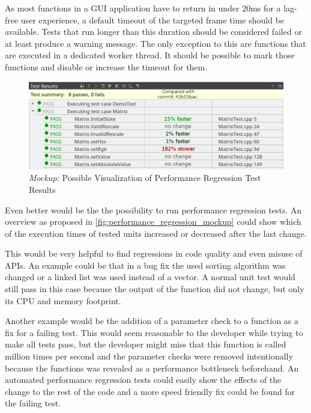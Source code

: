 \documentclass{scrreprt}
\begin{document}
As most functions in a GUI application have to return in under 20ms for a lag-free user experience, a default timeout of the targeted frame time should be available. Tests that run longer than this duration should be considered failed or at least produce a warning message. The only exception to this are functions that are executed in a dedicated worker thread. It should be possible to mark those functions and disable or increase the timeout for them.

\begin{figure}[h]
	\centering
	\includegraphics[width=1.0\textwidth]{img/performance_regression_mockup}
	\caption[Mockup: Performance Regression]{\textit{Mockup:} Possible Visualization of Performance Regression Test Results}
	\label{fig:performance_regression_mockup}
\end{figure}

Even better would be the the possibility to run performance regression tests. An overview as proposed in \vref{fig:performance_regression_mockup} could show which of the execution times of tested units increased or decreased after the last change.

This would be very helpful to find regressions in code quality and even misuse of APIs. An example could be that in a bug fix the used sorting algorithm was changed or a linked list was used instead of a vector. A normal unit test would still pass in this case because the output of the function did not change, but only its CPU and memory footprint.

Another example would be the addition of a parameter check to a function as a fix for a failing test. This would seem reasonable to the developer while trying to make all tests pass, but the developer might miss that this function is called million times per second and the parameter checks were removed intentionally because the functions was revealed as a performance bottleneck beforehand. An automated performance regression tests could easily show the effects of the change to the rest of the code and a more speed friendly fix could be found for the failing test.
\end{document}
